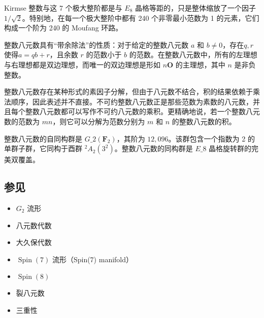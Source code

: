 Kirmse 整数与这 7 个极大整阶都是与 $E_{8}$ 晶格等距的，只是整体缩放了一个因子 $1/\sqrt{2}$。特别地，在每一个极大整阶中都有 240 个非零最小范数为 1 的元素，它们构成一个阶为 240 的 Moufang 环路。

整数八元数具有“带余除法”的性质：对于给定的整数八元数 $a$ 和 $b \neq 0$，存在$q,r$ 使得$a = qb + r$，且余数 $r$ 的范数小于 $b$ 的范数。在整数八元数中，所有的左理想与右理想都是双边理想，而唯一的双边理想是形如 $n\mathbf{O}$ 的主理想，其中 $n$ 是非负整数。

整数八元数存在某种形式的素因子分解，但由于八元数不结合，积的结果依赖于乘法顺序，因此表述并不直接。不可约整数八元数正是那些范数为素数的八元数，并且每个整数八元数都可以写作不可约八元数的乘积。更精确地说，若一个整数八元数的范数为 $mn$，则它可以分解为范数分别为 $m$ 和 $n$ 的整数八元数的积。

整数八元数的自同构群是 $G\_{2}(\mathbf{F}_{2})$，其阶为 $12,096$。该群包含一个指数为 2 的单群子群，它同构于酉群 $^{2}A_{2}(3^{2})$。整数八元数的同构群是 $E\_{8}$ 晶格旋转群的完美双覆盖。
\subsection{参见}
\begin{itemize}
\item $G_{2}$ 流形
\item 八元数代数
\item 大久保代数
\item $\operatorname{Spin}(7)$ 流形（Spin(7) manifold）
\item $\operatorname{Spin}(8)$
\item 裂八元数
\item 三重性
\end{itemize}
